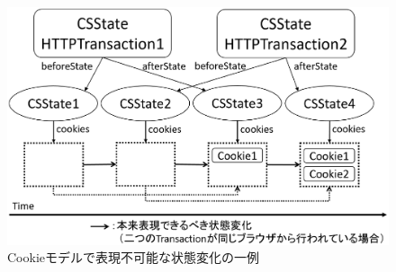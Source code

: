 \documentclass[journal]{IEEEtran}
\begin{document}
\begin{figure}[hbt]
\centering
\includegraphics[width=\hsize]{./fig/2transaction-b.eps}
\caption{Cookieモデルで表現不可能な状態変化の一例}
\label{fig:2transaction-b}
\end{figure}
\end{document}
